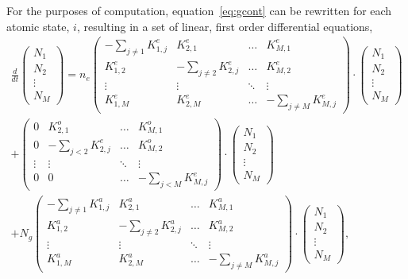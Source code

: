 For the purposes of computation, equation~\ref{eq:gcont} can be rewritten for
each atomic state, $i$, resulting in a set of linear, first order differential
equations,
\begin{multline}
  \frac{d}{dt}
  \begin{pmatrix}
    N_1 \\
    N_2 \\
    \vdots \\
    N_M
  \end{pmatrix}
  = n_e
  \begin{pmatrix}
    -\sum_{j\neq 1}K^e_{1,j} & K^e_{2,1}      & \hdots & K^e_{M,1} \\
    K^e_{1,2}      & -\sum_{j\neq 2}K^e_{2,j} & \hdots & K^e_{M,2} \\
    \vdots         & \vdots         & \ddots & \vdots    \\
    K^e_{1,M}      & K^e_{2,M}      & \hdots & -\sum_{j\neq M}K^e_{M,j}
  \end{pmatrix}
  \cdot
  \begin{pmatrix}
    N_1 \\
    N_2 \\
    \vdots \\
    N_M
  \end{pmatrix} \\
  +
  \begin{pmatrix}
    0      & K^o_{2,1}              & \hdots & K^o_{M,1} \\
    0      & -\sum_{j < 2}K^e_{2,j} & \hdots & K^o_{M,2} \\
    \vdots & \vdots                 & \ddots & \vdots    \\
    0      & 0                      & \hdots & -\sum_{j < M}K^e_{M,j}
  \end{pmatrix}
  \cdot
  \begin{pmatrix}
    N_1 \\
    N_2 \\
    \vdots \\
    N_M
  \end{pmatrix} \\
  + N_g
  \begin{pmatrix}
    -\sum_{j\neq 1}K^a_{1,j} & K^a_{2,1}      & \hdots & K^a_{M,1} \\
    K^a_{1,2}      & -\sum_{j\neq 2}K^a_{2,j} & \hdots & K^a_{M,2} \\
    \vdots         & \vdots         & \ddots & \vdots    \\
    K^a_{1,M}      & K^a_{2,M}      & \hdots & -\sum_{j\neq M}K^a_{M,j}
  \end{pmatrix}
  \cdot
  \begin{pmatrix}
    N_1 \\
    N_2 \\
    \vdots \\
    N_M
  \end{pmatrix}, \\
\end{multline}
